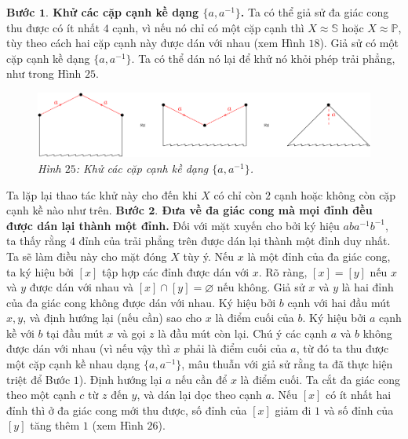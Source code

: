 \begin{multicols}{2}
	\vskip 0.1cm
	{\bf\color{duongvaotoanhoc} Bước $\pmb{1.}$ Khử các cặp cạnh kề dạng $\{a,a^{-1}\}$.} Ta có thể giả sử đa giác cong thu được có ít nhất $4$ cạnh, vì nếu nó chỉ có một cặp cạnh thì $X \approx \mathbb{S}$ hoặc $X \approx \mathbb{P}$, tùy theo cách hai cặp cạnh này được dán với nhau (xem Hình $18$). Giả sử có một cặp cạnh kề dạng $\{a,a^{-1}\}$. Ta có thể dán nó lại để khử nó khỏi phép trải phẳng, như trong Hình $25$.
	\begin{figure}[H]
		\vspace*{-5pt}
		\centering\captionsetup{labelformat=empty, justification=centering}
		\includegraphics[width=1\linewidth]{H25.pdf}
		\caption{\small\textit{\color{duongvaotoanhoc}Hình $25$: Khử các cặp cạnh kề dạng $\{a,a^{-1}\}$.}}
		\vspace*{-10pt}
	\end{figure}
	Ta lặp lại thao tác khử này cho đến khi $X$ có chỉ còn $2$ cạnh hoặc không còn cặp cạnh kề nào như trên.
	\vskip 0.1cm
	{\bf\color{duongvaotoanhoc} Bước $\pmb{2.}$ Đưa về đa giác cong mà mọi đỉnh đều được dán lại thành một đỉnh.} Đối với mặt xuyến cho bởi ký hiệu $aba^{-1}b^{-1}$, ta thấy rằng $4$ đỉnh của trải phẳng trên được dán lại thành một đỉnh duy nhất. Ta sẽ làm điều này cho mặt đóng $X$ tùy ý. Nếu $x$ là một đỉnh của đa giác cong, ta ký hiệu bởi $[x]$ tập hợp các đỉnh được dán với $x$. Rõ ràng, $[x] = [y]$ nếu $x$ và $y$ được dán với nhau và $[x] \cap [y] = \varnothing$ nếu không.
	\vskip 0.1cm
	Giả sử $x$ và $y$ là hai đỉnh của đa giác cong không được dán với nhau. Ký hiệu bởi $b$ cạnh với hai đầu mút $x,y$, và định hướng lại (nếu cần) sao cho $x$ là điểm cuối của $b$. Ký hiệu bởi $a$ cạnh kề với $b$ tại đầu mút $x$ và gọi $z$ là đầu mút còn lại. Chú ý các cạnh $a$ và $b$ không được dán với nhau (vì nếu vậy thì $x$ phải là điểm cuối của $a$, từ đó ta thu được một cặp cạnh kề nhau dạng $\{a,a^{-1}\}$, mâu thuẫn với giả sử rằng ta đã thực hiện triệt để Bước $1$). Định hướng lại $a$ nếu cần để $x$ là điểm cuối. Ta cắt đa giác cong theo một cạnh $c$ từ $z$ đến $y$, và dán lại dọc theo cạnh $a$. Nếu $[x]$ có ít nhất hai đỉnh thì ở đa giác cong mới thu được, số đỉnh của $[x]$ giảm đi $1$ và số đỉnh của $[y]$ tăng thêm $1$ (xem Hình $26$).
	\begin{figure}[H]

\end{figure}
\end{multicols}
